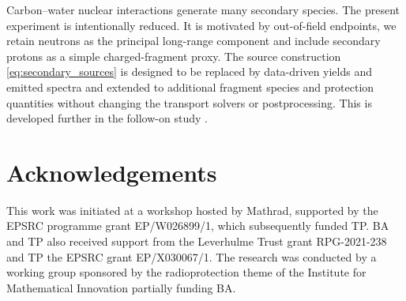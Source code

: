 \documentclass[final]{amsart}
\begin{document}
\begin{remark}
  Carbon--water nuclear interactions generate many secondary
  species. The present experiment is intentionally reduced. It is
  motivated by out-of-field endpoints, we retain neutrons as the
  principal long-range component and include secondary protons as a
  simple charged-fragment proxy. The source construction
  \eqref{eq:secondary_sources} is designed to be replaced by
  data-driven yields and emitted spectra and extended to additional
  fragment species and protection quantities without changing the
  transport solvers or postprocessing. This is developed further in
  the follow-on study \cite{mmb}.
\end{remark}

\section*{Acknowledgements}

This work was initiated at a workshop hosted by Mathrad, supported by
the EPSRC programme grant EP/W026899/1, which subsequently funded
TP. BA and TP also received support from the Leverhulme Trust grant
RPG-2021-238 and TP the EPSRC grant EP/X030067/1. The research was
conducted by a working group sponsored by the radioprotection theme of
the Institute for Mathematical Innovation partially funding BA.

\printbibliography
\end{document}
